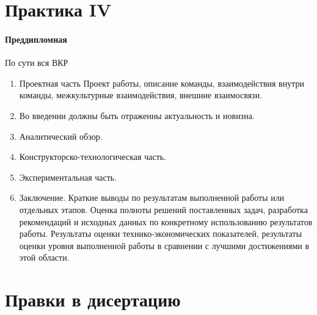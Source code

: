 \section{Практика IV}

\paragraph{Преддипломная}
По сути вся ВКР
\begin{enumerate}
    \item Проектная часть
    Проект работы, описание команды, взаимодействия внутри команды, межкультурные взаимодействия, внешние взаимосвязи.
    \item Во введении должны быть отраженны актуальность и новизна.
    \item Аналитический обзор.
    \item Конструкторско-технологическая часть.
    \item Экспериментальная часть.
    \item Заключение.
    Краткие выводы по результатам выполненной работы или отдельных этапов. Оценка полноты решений поставленных задач, разработка рекомендаций и исходных данных по конкретному использованию результатов работы. Результаты оценки технико-экономических показателей, результаты оценки уровня выполненной работы в сравнении с лучшими достижениями в этой области.
\end{enumerate}


\section{Правки в дисертацию}

